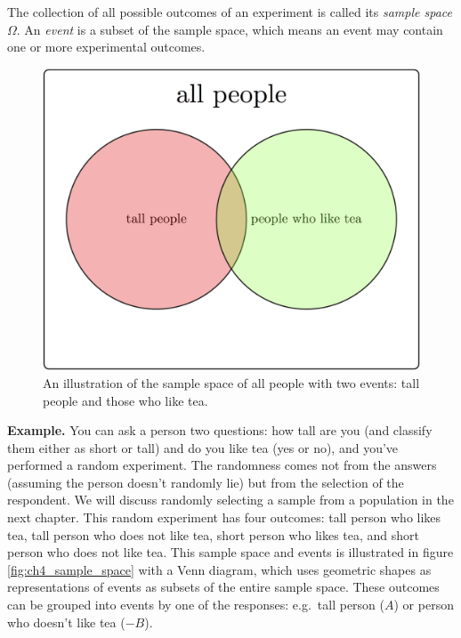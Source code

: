\documentclass[
  letterpaper,
  DIV=11,
  numbers=noendperiod]{scrreprt}
\begin{document}
\begin{tcolorbox}[enhanced jigsaw, arc=.35mm, colframe=quarto-callout-note-color-frame, left=2mm, opacitybacktitle=0.6, breakable, title=\textcolor{quarto-callout-note-color}{\faInfo}\hspace{0.5em}{Definition}, toprule=.15mm, coltitle=black, bottomtitle=1mm, toptitle=1mm, colback=white, leftrule=.75mm, colbacktitle=quarto-callout-note-color!10!white, titlerule=0mm, opacityback=0, rightrule=.15mm, bottomrule=.15mm]

The collection of all possible outcomes of an experiment is called its
\emph{sample space} \(\Omega\). An \emph{event} is a subset of the
sample space, which means an event may contain one or more experimental
outcomes.

\end{tcolorbox}

\begin{figure}

{\centering \includegraphics{./ch4/sample_space.png}

}

\caption{An illustration of the sample space of all people with two
events: tall people and those who like tea.}

\end{figure}

\textbf{Example.} You can ask a person two questions: how tall are you
(and classify them either as short or tall) and do you like tea (yes or
no), and you've performed a random experiment. The randomness comes not
from the answers (assuming the person doesn't randomly lie) but from the
selection of the respondent. We will discuss randomly selecting a sample
from a population in the next chapter. This random experiment has four
outcomes: tall person who likes tea, tall person who does not like tea,
short person who likes tea, and short person who does not like tea. This
sample space and events is illustrated in figure
\ref{fig:ch4_sample_space} with a Venn diagram, which uses geometric
shapes as representations of events as subsets of the entire sample
space. These outcomes can be grouped into events by one of the
responses: e.g.~tall person (\(A\)) or person who doesn't like tea
(\(-B\)).
\end{document}
